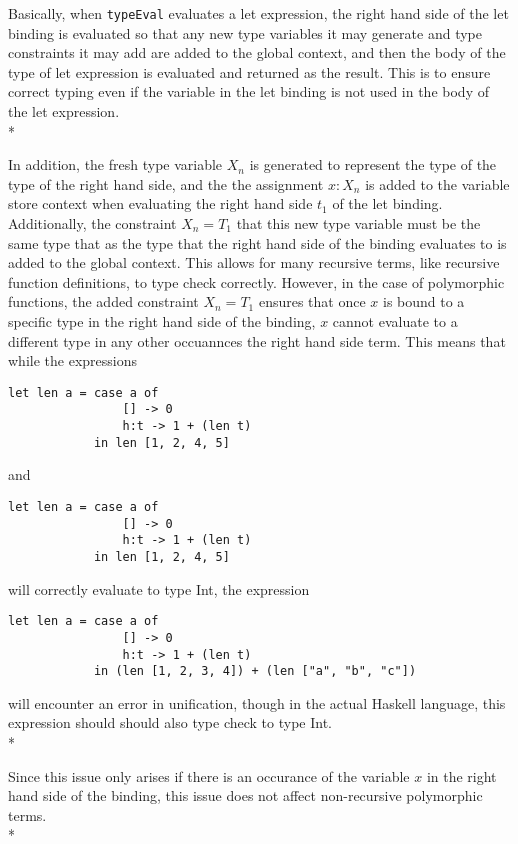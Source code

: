 \documentclass[11pt]{article}
\begin{document}
Basically, when \verb|typeEval| evaluates a let expression, the right hand side of the let binding is evaluated 
so that any new type variables it may generate and type constraints it may add are added to the 
global context, and then the body of the type of let expression is evaluated and returned as the result.  This is to 
ensure correct typing even if the variable in the let binding is not used in 
the body of the let expression.\\*

In addition, the fresh type variable $X_{n}$ is generated to represent the type of the 
type of the right hand side, and the the assignment $x : X_{n}$ is added to the variable store 
context when evaluating the right hand side $t_{1}$ of the let binding. Additionally, the constraint $X_{n} = T_{1}$ that this new 
type variable must be the same type that as the type that the right hand side of the binding evaluates to is added to the global context.  
This allows for many recursive terms, 
like recursive function definitions, to type check correctly. However, in the case of polymorphic functions, 
the added constraint $X_{n} = T_{1}$ ensures that once $x$ is bound to a specific type in the right hand side 
of the binding, $x$ cannot evaluate to a different type in any other occuannces the right hand side term.
This means that while the expressions
\begin{verbatim} 
let len a = case a of
                [] -> 0
                h:t -> 1 + (len t)
            in len [1, 2, 4, 5]
\end{verbatim}
and 
\begin{verbatim} 
let len a = case a of
                [] -> 0
                h:t -> 1 + (len t)
            in len [1, 2, 4, 5]
\end{verbatim}
will correctly evaluate to type Int, the expression
\begin{verbatim} 
let len a = case a of
                [] -> 0
                h:t -> 1 + (len t)
            in (len [1, 2, 3, 4]) + (len ["a", "b", "c"])
\end{verbatim} 
will encounter an error in unification, though in the actual Haskell language, this expression should should 
also type check to type Int.\\*

Since this issue only arises if there is an occurance of the variable $x$ in the right hand side of 
the binding, this issue does not affect non-recursive polymorphic terms.\\* 
\end{document}
